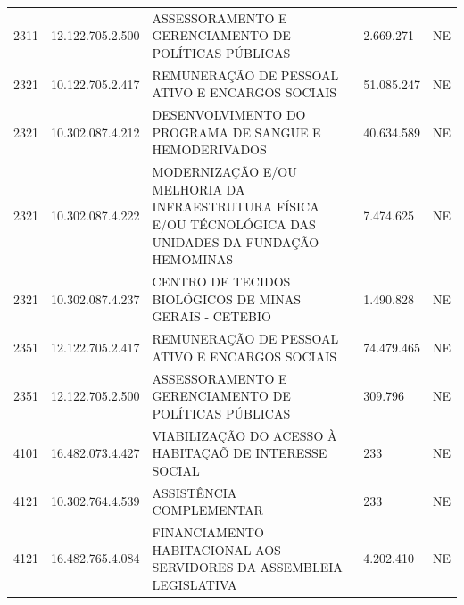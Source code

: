 \documentclass{article}
\begin{document}
\begin{longtable}[c]{m{1cm}|m{2cm}|m{10cm}|m{2cm}|m{1cm}}
\multicolumn{1}{C{1cm}|}{2311} & \multicolumn{1}{C{2cm}|}{12.122.705.2.500} & \multicolumn{1}{L{10cm}|}{ASSESSORAMENTO E GERENCIAMENTO DE POLÍTICAS PÚBLICAS} & \multicolumn{1}{R{2cm}|}{2.669.271} & \multicolumn{1}{C{1cm}}{NE} \\
\multicolumn{1}{C{1cm}|}{2321} & \multicolumn{1}{C{2cm}|}{10.122.705.2.417} & \multicolumn{1}{L{10cm}|}{REMUNERAÇÃO DE PESSOAL ATIVO E ENCARGOS SOCIAIS} & \multicolumn{1}{R{2cm}|}{51.085.247} & \multicolumn{1}{C{1cm}}{NE} \\
\multicolumn{1}{C{1cm}|}{2321} & \multicolumn{1}{C{2cm}|}{10.302.087.4.212} & \multicolumn{1}{L{10cm}|}{DESENVOLVIMENTO DO PROGRAMA DE SANGUE E HEMODERIVADOS} & \multicolumn{1}{R{2cm}|}{40.634.589} & \multicolumn{1}{C{1cm}}{NE} \\
\multicolumn{1}{C{1cm}|}{2321} & \multicolumn{1}{C{2cm}|}{10.302.087.4.222} & \multicolumn{1}{L{10cm}|}{MODERNIZAÇÃO E/OU MELHORIA DA INFRAESTRUTURA FÍSICA E/OU TÉCNOLÓGICA DAS UNIDADES DA FUNDAÇÃO HEMOMINAS} & \multicolumn{1}{R{2cm}|}{7.474.625} & \multicolumn{1}{C{1cm}}{NE} \\
\multicolumn{1}{C{1cm}|}{2321} & \multicolumn{1}{C{2cm}|}{10.302.087.4.237} & \multicolumn{1}{L{10cm}|}{CENTRO DE TECIDOS BIOLÓGICOS DE MINAS GERAIS - CETEBIO} & \multicolumn{1}{R{2cm}|}{1.490.828} & \multicolumn{1}{C{1cm}}{NE} \\
\multicolumn{1}{C{1cm}|}{2351} & \multicolumn{1}{C{2cm}|}{12.122.705.2.417} & \multicolumn{1}{L{10cm}|}{REMUNERAÇÃO DE PESSOAL ATIVO E ENCARGOS SOCIAIS} & \multicolumn{1}{R{2cm}|}{74.479.465} & \multicolumn{1}{C{1cm}}{NE} \\
\multicolumn{1}{C{1cm}|}{2351} & \multicolumn{1}{C{2cm}|}{12.122.705.2.500} & \multicolumn{1}{L{10cm}|}{ASSESSORAMENTO E GERENCIAMENTO DE POLÍTICAS PÚBLICAS} & \multicolumn{1}{R{2cm}|}{309.796} & \multicolumn{1}{C{1cm}}{NE} \\
\multicolumn{1}{C{1cm}|}{4101} & \multicolumn{1}{C{2cm}|}{16.482.073.4.427} & \multicolumn{1}{L{10cm}|}{VIABILIZAÇÃO DO ACESSO À HABITAÇAÕ DE INTERESSE SOCIAL} & \multicolumn{1}{R{2cm}|}{233} & \multicolumn{1}{C{1cm}}{NE} \\
\multicolumn{1}{C{1cm}|}{4121} & \multicolumn{1}{C{2cm}|}{10.302.764.4.539} & \multicolumn{1}{L{10cm}|}{ASSISTÊNCIA COMPLEMENTAR} & \multicolumn{1}{R{2cm}|}{233} & \multicolumn{1}{C{1cm}}{NE} \\
\multicolumn{1}{C{1cm}|}{4121} & \multicolumn{1}{C{2cm}|}{16.482.765.4.084} & \multicolumn{1}{L{10cm}|}{FINANCIAMENTO HABITACIONAL AOS SERVIDORES DA ASSEMBLEIA LEGISLATIVA} & \multicolumn{1}{R{2cm}|}{4.202.410} & \multicolumn{1}{C{1cm}}{NE} \\

\end{longtable}
\end{document}
